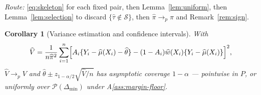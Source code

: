 \documentclass[11pt]{article}
\theoremstyle{plain}
\newtheorem{corollary}{Corollary}
\theoremstyle{definition}
\theoremstyle{remark}
\newcommand{\cS}{\mathcal{S}}
\newcommand{\cP}{\mathcal{P}}
\newcommand{\mhat}{\widehat{\mu}}
\newcommand{\what}{\widehat{w}}
\newcommand{\that}{\widehat{\tau}}
\newcommand{\thetahat}{\widehat{\theta}}
\newcommand{\pihat}{\widehat{\pi}}
\newcommand{\Vhat}{\widehat{V}}
\begin{document}
\noindent \emph{Route:} \eqref{eq:skeleton} for each fixed pair, then
Lemma~\ref{lem:uniform}, then Lemma~\ref{lem:selection} to discard
$\{\that\notin\cS\}$, then $\pihat\to_p\pi$ and Remark~\ref{rem:sign}.

\begin{corollary}[Variance estimation and confidence intervals]\label{cor:variance}
With
\begin{equation}\label{eq:vhat}
 \Vhat=\frac1{n\pihat^2}\sum_{i=1}^n\Bigl[A_i\{Y_i-\mhat(X_i)-\thetahat\}
  -(1-A_i)\what(X_i)\{Y_i-\mhat(X_i)\}\Bigr]^2,
\end{equation}
$\Vhat\to_pV$ and $\thetahat\pm z_{1-\alpha/2}\sqrt{\Vhat/n}$ has asymptotic
coverage $1-\alpha$ --- pointwise in $P$, or uniformly over $\cP(\Delta_{\min})$
under A\ref{ass:margin-floor}.
\end{corollary}
\end{document}
